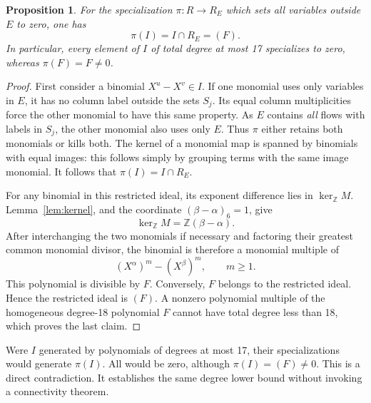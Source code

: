 \documentclass[11pt,a4paper]{article}
\newtheorem{proposition}[theorem]{Proposition}
\newcommand{\ZZ}{\mathbb Z}
\begin{document}
\begin{proposition}\label{prop:retract}
For the specialization $\pi:R\longrightarrow R_E$ which sets all
variables outside $E$ to zero, one has
\[
 \pi(I)=I\cap R_E=(F).
\]
In particular, every element of $I$ of total degree at most 17 specializes
to zero, whereas $\pi(F)=F\ne0$.
\end{proposition}
\begin{proof}
First consider a binomial $X^u-X^v\in I$. If one monomial uses only
variables in $E$, it has no column label outside the sets $S_j$.
Its equal column multiplicities force the other monomial to have this
same property. As $E$ contains \emph{all} flows with labels in $S_j$,
the other monomial also uses only $E$. Thus $\pi$ either retains both
monomials or kills both. The kernel of a monomial map is spanned by
binomials with equal images: this follows simply by grouping terms with
the same image monomial. It follows that $\pi(I)=I\cap R_E$.

For any binomial in this restricted ideal, its exponent difference lies
in $\ker_{\ZZ}M$. Lemma~\ref{lem:kernel}, and the coordinate
$(\beta-\alpha)_6=1$, give
\[
 \ker_{\ZZ}M=\ZZ(\beta-\alpha).
\]
After interchanging the two monomials if necessary and factoring their
greatest common monomial divisor, the binomial is therefore a monomial
multiple of
\[
 (X^\alpha)^m-(X^\beta)^m,
 \qquad m\geq1.
\]
This polynomial is divisible by $F$. Conversely, $F$ belongs to the
restricted ideal. Hence the restricted ideal is $(F)$.
A nonzero polynomial multiple of the homogeneous degree-18 polynomial
$F$ cannot have total degree less than 18, which proves the last claim.
\end{proof}

Were $I$ generated by polynomials of degrees at most 17, their
specializations would generate $\pi(I)$. All would be zero, although
$\pi(I)=(F)\ne0$. This is a direct contradiction. It establishes the
same degree lower bound without invoking a connectivity theorem.

\clearpage
\end{document}
